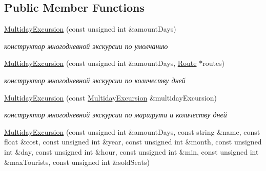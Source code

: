 \subsection*{Public Member Functions}
\begin{DoxyCompactItemize}
\item 
\hypertarget{class_multiday_excursion_a665b8ff500f3f677f4236c0e9681d0ab}{}\hyperlink{class_multiday_excursion_a665b8ff500f3f677f4236c0e9681d0ab}{Multiday\+Excursion} (const unsigned int \&amount\+Days)\label{class_multiday_excursion_a665b8ff500f3f677f4236c0e9681d0ab}

\begin{DoxyCompactList}\small\item\em конструктор многодневной экскурсии по умолчанию \end{DoxyCompactList}\item 
\hypertarget{class_multiday_excursion_a0f41663ad3b87b0c117d22caa404c4bf}{}\hyperlink{class_multiday_excursion_a0f41663ad3b87b0c117d22caa404c4bf}{Multiday\+Excursion} (const unsigned int \&amount\+Days, \hyperlink{class_route}{Route} $\ast$routes)\label{class_multiday_excursion_a0f41663ad3b87b0c117d22caa404c4bf}

\begin{DoxyCompactList}\small\item\em конструктор многодневной экскурсии по количеству дней \end{DoxyCompactList}\item 
\hypertarget{class_multiday_excursion_ac96c4846502a92d9938c8f93bb368b3c}{}\hyperlink{class_multiday_excursion_ac96c4846502a92d9938c8f93bb368b3c}{Multiday\+Excursion} (const \hyperlink{class_multiday_excursion}{Multiday\+Excursion} \&multiday\+Excursion)\label{class_multiday_excursion_ac96c4846502a92d9938c8f93bb368b3c}

\begin{DoxyCompactList}\small\item\em конструктор многодневной экскурсии по маршрута и количеству дней \end{DoxyCompactList}\item 
\hypertarget{class_multiday_excursion_a445b5758b3b56b57aeb1583e2104abcc}{}\hyperlink{class_multiday_excursion_a445b5758b3b56b57aeb1583e2104abcc}{Multiday\+Excursion} (const unsigned int \&amount\+Days, const string \&name, const float \&cost, const unsigned int \&year, const unsigned int \&month, const unsigned int \&day, const unsigned int \&hour, const unsigned int \&min, const unsigned int \&max\+Tourists, const unsigned int \&sold\+Seats)\label{class_multiday_excursion_a445b5758b3b56b57aeb1583e2104abcc}


\end{DoxyCompactItemize}
